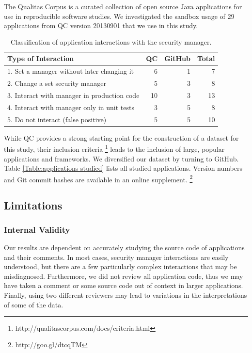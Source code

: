\documentclass{sig-alternate}
\begin{document}
The Qualitas Corpus is a curated collection of open source Java applications
for use in reproducible software studies. We investigated the sandbox
usage of 29 applications from QC version 20130901 that we use in this
study.

\begin{table}
\caption{Classification of application interactions with the security manager.}
\label{tab:Classification-of-Application}

\centering{}%
\begin{tabular}{lrrr}
\toprule 
Type of Interaction & QC & GitHub & Total\tabularnewline
\midrule
1. Set a manager without later changing it & 6 & 1 & 7\tabularnewline
2. Change a set security manager & 5 & 3 & 8\tabularnewline
3. Interact with manager in production code & 10 & 3 & 13\tabularnewline
4. Interact with manager only in unit tests & 3 & 5 & 8\tabularnewline
5. Do not interact (false positive) & 5 & 5 & 10\tabularnewline
\bottomrule
\end{tabular}
\end{table}


While QC provides a strong starting point for the construction of
a dataset for this study, their inclusion criteria%
\footnote{http://qualitascorpus.com/docs/criteria.html%
} leads to the inclusion of large, popular applications and frameworks.
We diversified our dataset by turning to GitHub. Table \ref{Table:applications-studied}
lists all studied applications. Version numbers and Git commit hashes
are available in an online supplement.%
\footnote{http://goo.gl/dtcqTM%
}


\subsection{Limitations}\label{sub:Limitations-Study}


\subsubsection{Internal Validity}

Our results are dependent on accurately studying the source code of
applications and their comments. In most cases, security manager interactions
are easily understood, but there are a few particularly complex interactions
that may be misdiagnosed. Furthermore, we did not review all application
code, thus we may have taken a comment or some source code out of
context in larger applications. Finally, using two different reviewers
may lead to variations in the interpretations of some of the data. 
\end{document}
